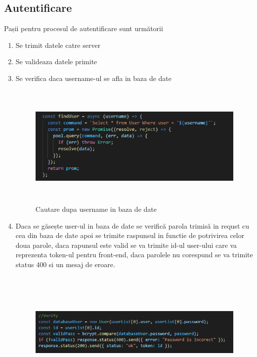 \subsection{Autentificare}

\par Pașii pentru procesul de autentificare sunt următorii

	\begin{enumerate}
	
	\item Se trimit datele catre server
	
	\item Se valideaza datele primite
	
	\item Se verifica daca username-ul se afla in baza de date
			
		\begin{figure}[htbp]
		
		\centerline{\includegraphics[width=19cm, height=6cm]{figures/cautare user.png}}
		
		\caption{Cautare dupa username in baza de date}
		
		\label{fig}
		
		\end{figure}

\item Daca se găsește user-ul in baza de date se verifică parola trimisă in requst cu cea din baza de date apoi se trimite raspunsul in functie de potrivirea celor doua parole, daca rapunsul este valid se va trimite id-ul user-ului care va reprezenta token-ul pentru front-end, daca parolele nu corespund se va trimite status 400 si un mesaj de eroare.

	\begin{figure}[htbp]

		\centerline{\includegraphics[width=19cm, height=6cm]{figures/verificare login.png}}
	

\end{figure}
\end{enumerate}
